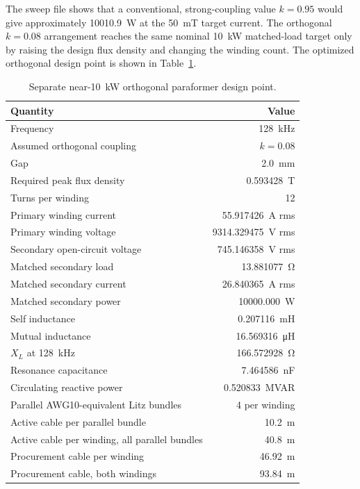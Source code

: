 The sweep file shows that a conventional, strong-coupling value \(k=0.95\)
would give approximately \SI{10010.9}{\watt} at the \SI{50}{\milli\tesla}
target current. The orthogonal \(k=0.08\) arrangement reaches the same nominal
\SI{10}{\kilo\watt} matched-load target only by raising the design flux density
and changing the winding count. The optimized orthogonal design point is shown
in Table~\ref{tab:updated-near-10kw-paraformer}.

\begin{table}[H]
\centering
\caption{Separate near-\SI{10}{\kilo\watt} orthogonal paraformer design point.}
\label{tab:updated-near-10kw-paraformer}
\begin{tabular}{lr}
\toprule
Quantity & Value \\
\midrule
Frequency & \SI{128}{\kilo\hertz} \\
Assumed orthogonal coupling & \(k=0.08\) \\
Gap & \SI{2.0}{\milli\metre} \\
Required peak flux density & \SI{0.593428}{\tesla} \\
Turns per winding & 12 \\
Primary winding current & \SI{55.917426}{\ampere} rms \\
Primary winding voltage & \SI{9314.329475}{\volt} rms \\
Secondary open-circuit voltage & \SI{745.146358}{\volt} rms \\
Matched secondary load & \SI{13.881077}{\ohm} \\
Matched secondary current & \SI{26.840365}{\ampere} rms \\
Matched secondary power & \SI{10000.000}{\watt} \\
Self inductance & \SI{0.207116}{\milli\henry} \\
Mutual inductance & \SI{16.569316}{\micro\henry} \\
\(X_L\) at \SI{128}{\kilo\hertz} & \SI{166.572928}{\ohm} \\
Resonance capacitance & \SI{7.464586}{\nano\farad} \\
Circulating reactive power & \SI{0.520833}{MVAR} \\
Parallel AWG10-equivalent Litz bundles & 4 per winding \\
Active cable per parallel bundle & \SI{10.2}{\metre} \\
Active cable per winding, all parallel bundles & \SI{40.8}{\metre} \\
Procurement cable per winding & \SI{46.92}{\metre} \\
Procurement cable, both windings & \SI{93.84}{\metre} \\
\bottomrule
\end{tabular}
\end{table}


